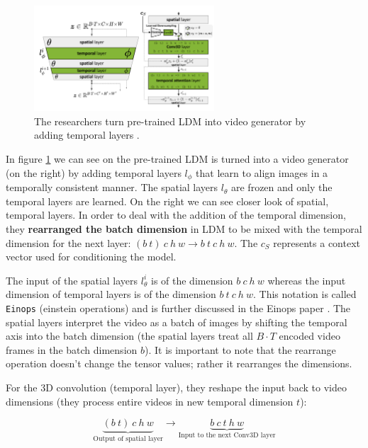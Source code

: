 \begin{figure}
    \centering
    \includegraphics[width=0.6\textwidth]{images/video_ldm/temporal_layers.png}
    \caption{The researchers turn pre-trained LDM into video generator by adding temporal layers \cite{video_ldm}.}
    \label{fig:video_ldm_spatial_temporal_mixing_layers}
\end{figure}

In figure \ref{fig:video_ldm_spatial_temporal_mixing_layers} we can see on the pre-trained LDM is turned into a video generator (on the right) by adding temporal layers $l_\phi$ that learn to align images in a temporally consistent manner. The spatial layers $l_\theta$ are frozen and only the temporal layers are learned. On the right we can see closer look of spatial, temporal layers. In order to deal with the addition of the temporal dimension, they \textbf{rearranged the batch dimension} in LDM to be mixed with the temporal dimension for the next layer: $(b\ t)\ c\ h\ w \rightarrow b\ t\ c\ h\ w$. The $c_S$ represents a context vector used for conditioning the model.

The input of the spatial layers $l_\theta^i$ is of the dimension $b\ c\ h\ w$ whereas the input dimension of temporal layers is of the dimension $b\ t\ c\ h\ w$. This notation is called \texttt{Einops} (einstein operations) and is further discussed in the Einops paper \cite{einops}. The spatial layers interpret the video as a batch of images by shifting the temporal axis into the batch dimension (the spatial layers treat all $B \cdot T$ encoded video frames in the batch dimension $b$). It is important to note that the rearrange operation doesn't change the tensor values; rather it rearranges the dimensions.

For the 3D convolution (temporal layer), they reshape the input back to video dimensions (they process entire videos in new temporal dimension $t$): 

\[ \underbrace{(b\ t)\ c\ h\ w}_{\text{Output of spatial layer}} \rightarrow \underbrace{b\ c\ t\ h\ w}_{\text{Input to the next Conv3D layer}} \]

